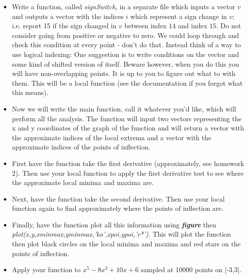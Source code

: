 \documentclass[11pt]{article}
\begin{document}
\begin{enumerate}
	\begin{itemize}
		\item Write a function, called \textit{signSwitch}, in a separate file which inputs a vector $v$ and outputs a vector with the indices $i$ which represent a sign change in $v$; i.e. report 15 if the sign changed in $v$ between index $14$ and index $15$. Do not consider going from positive or negative to zero. We could loop through and check this condition at every point - don’t do that. Instead think of a way to use logical indexing: One suggestion is to write conditions on the vector and some kind of shifted version of itself. Beware however, when you do this you will have non-overlapping points. It is up to you to figure out what to with them. This will be a local function (see the documentation if you forgot what this means).
		\item Now we will write the main function, call it whatever you'd like, which will perform all the analysis. The function will input two vectors representing the x and y coordinates of the graph of the function and will return a vector with the approximate indices of the local extrema and a vector with the approximate indices of the points of inflection.
		\item First have the function take the first derivative (approximately, see homework 2). Then use your local function to apply the first derivative test to see where the approximate local minima and maxima are.
		\item Next, have the function take the second derivative. Then use your local function again to find approximately where the points of inflection are.
		\item Finally, have the function plot all this information using \textbf{\textit{figure}} then \\ \textit{plot(x,y,xminmax,yminmax,'ko',xpoi,ypoi,'r*')}. This will plot the function then plot black circles on the local minima and maxima and red stars on the points of inflection.
		\item Apply your function to $x^5-8x^3+10x+6$ sampled at 10000 points on [-3,3].
	\end{itemize}
\end{enumerate}
\end{document}
